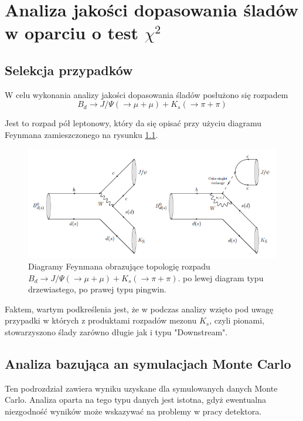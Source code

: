 \chapter{Analiza jakości dopasowania śladów w oparciu o test $\chi^2$}
\section{Selekcja przypadków}
W celu wykonania analizy jakości dopasowania śladów posłużono się rozpadem 
\begin{equation}
B_d \rightarrow J/\Psi(\rightarrow \mu +\mu) + K_s(\rightarrow \pi + \pi )
\end{equation}

Jest to rozpad pół leptonowy, który da się opisać przy użyciu diagramu Feynmana zamieszczonego na rysunku \ref{rys:BJPsi}.

 \begin{figure}[h]
 \centering
 \includegraphics[scale=0.8]{rozdzial6/Feynman.png}
 \caption{Diagramy Feynmana obrazujące topologię rozpadu $B_d \rightarrow J/\Psi(\rightarrow \mu +\mu) + K_s(\rightarrow \pi + \pi )$. po lewej diagram typu drzewiastego, po prawej typu pingwin. }
 \label{rys:BJPsi}
\end{figure}

Faktem, wartym podkreślenia jest, że w podczas analizy wzięto pod uwagę przypadki w których z produktami rozpadów mezonu $K_s$, czyli pionami, stowarzyszono ślady zarówno długie jak i typu "Downstream".
\section{Analiza bazująca an symulacjach Monte Carlo} 
Ten podrozdział zawiera wyniku uzyskane dla symulowanych danych Monte Carlo. Analiza oparta na tego typu danych jest istotna, gdyż ewentualna niezgodność wyników może wskazywać na problemy w pracy detektora. 

